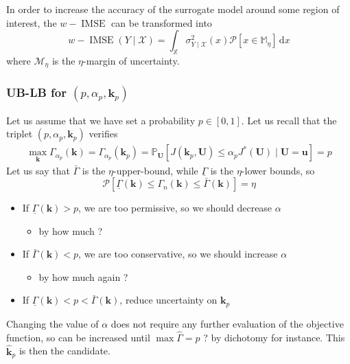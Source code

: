 \documentclass[a4paper,11pt]{article}
\newcommand{\Prob}{\mathbb{P}}
\newcommand{\ProbGP}{\mathcal{P}}
\newcommand{\Xspace}{\mathbb{X}}
\DeclareMathOperator{\IMSE}{IMSE}
\theoremstyle{defi}
\numberwithin{thmCounter}{section}
\begin{document}
In order to increase the accuracy of the surrogate model around some region of interest, the $w-\IMSE$ can be transformed into
\begin{equation}
  w-\IMSE(Y\mid \mathcal{X}) = \int_{\Xspace} \sigma_{Y\mid\mathcal{X}}^2(x)\ProbGP\left[x \in \mathbb{M}_{\eta}\right]\,\mathrm{d}x
\end{equation}
where $\mathcal{M}_{\eta}$ is the $\eta$-margin of uncertainty.

\subsubsection{UB-LB for $(p, \alpha_p, \mathbf{k}_p)$}
Let us assume that we have set a probability $p\in [0,1]$. Let us recall that the triplet $(p, \alpha_p, \mathbf{k}_p)$ verifies
\begin{align}
  \max_{\mathbf{k}} \Gamma_{\alpha_p}(\mathbf{k}) = \Gamma_{\alpha_p}(\mathbf{k}_p) = \Prob_{\mathbf{U}}\left[J(\mathbf{k}_p,\mathbf{U}) \leq \alpha_p J^*(\mathbf{U})\mid \mathbf{U} = \mathbf{u}\right] = p
\end{align}
Let us say that $\bar{\Gamma}$ is the $\eta$-upper-bound, while $\underline{\Gamma}$ is the $\eta$-lower bounds, so
\begin{equation}
  \ProbGP\left[\underline{\Gamma}(\mathbf{k}) \leq \Gamma_n(\mathbf{k}) \leq \bar{\Gamma}(\mathbf{k})\right] = \eta
\end{equation}
\begin{itemize}
\item If $\underline{\Gamma}(\mathbf{k})>p$, we are too permissive, so we should decrease $\alpha$
  \begin{itemize}
  \item by how much ?
  \end{itemize}
\item If $\bar{\Gamma}(\mathbf{k})<p$, we are too conservative, so we should increase $\alpha$
  \begin{itemize}
  \item by how much again ?
  \end{itemize}
 \item If $\underline{\Gamma}(\mathbf{k})<p<\bar{\Gamma}(\mathbf{k})$, reduce uncertainty on $\mathbf{k}_p$
\end{itemize}
Changing the value of $\alpha$ does not require any further evaluation of the objective function, so can be increased until $\max \hat{\Gamma} = p$ ? by dichotomy for instance. This $\hat{\mathbf{k}}_p$ is then the candidate.
\end{document}

